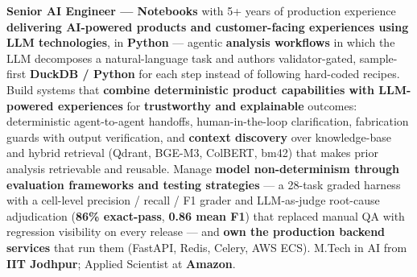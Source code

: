\documentclass[letter,10pt]{article}
\begin{document}

\textbf{Senior AI Engineer --- Notebooks} with 5+ years of production experience \textbf{delivering AI-powered products and customer-facing experiences using LLM technologies}, in \textbf{Python} --- agentic \textbf{analysis workflows} in which the LLM decomposes a natural-language task and authors validator-gated, sample-first \textbf{DuckDB / Python} for each step instead of following hard-coded recipes.
Build systems that \textbf{combine deterministic product capabilities with LLM-powered experiences} for \textbf{trustworthy and explainable} outcomes: deterministic agent-to-agent handoffs, human-in-the-loop clarification, fabrication guards with output verification, and \textbf{context discovery} over knowledge-base and hybrid retrieval (Qdrant, BGE-M3, ColBERT, bm42) that makes prior analysis retrievable and reusable.
Manage \textbf{model non-determinism through evaluation frameworks and testing strategies} --- a 28-task graded harness with a cell-level precision / recall / F1 grader and LLM-as-judge root-cause adjudication (\textbf{86\% exact-pass}, \textbf{0.86 mean F1}) that replaced manual QA with regression visibility on every release --- and \textbf{own the production backend services} that run them (FastAPI, Redis, Celery, AWS ECS).
M.Tech in AI from \textbf{IIT Jodhpur}; Applied Scientist at \textbf{Amazon}.
\end{document}
